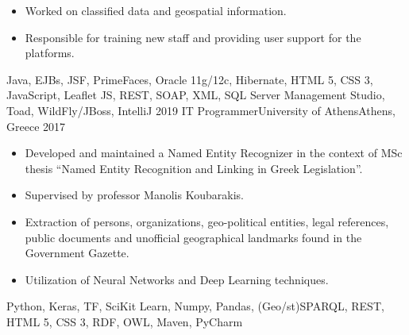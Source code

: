 \begin{experiences}
{\begin{itemize}
                      \item Worked on classified data and geospatial information.

                      \item Responsible for training new staff and providing user support for the platforms.
                    \end{itemize}
                    }
                    {Java, EJBs, JSF, PrimeFaces, Oracle 11g/12c, Hibernate, HTML 5, CSS 3, JavaScript, Leaflet JS, REST, SOAP, XML, SQL Server Management Studio, Toad, WildFly/JBoss, IntelliJ}
  \emptySeparator
  \experience
    {2019} {IT Programmer}{University of Athens}{Athens, Greece}
    {2017}    {
                    \begin{itemize}
                      \item Developed and maintained a Named Entity Recognizer in the context of MSc thesis ``Named Entity Recognition and Linking in Greek Legislation''.

                      \item Supervised by professor Manolis Koubarakis.

                      \item Extraction of persons, organizations, geo-political entities, legal references, public documents and unofficial geographical landmarks found in the Government Gazette.

                      \item Utilization of Neural Networks and Deep Learning techniques.
                    \end{itemize}
                    }
                    {Python, Keras, TF, SciKit Learn, Numpy, Pandas, (Geo/st)SPARQL, REST, HTML 5, CSS 3, RDF, OWL, Maven, PyCharm}
\end{experiences}
